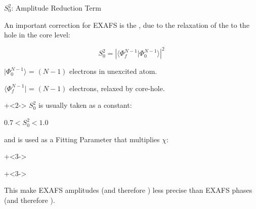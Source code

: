 \begin{slide}{$S_0^2$:  Amplitude Reduction Term}

  An important correction for EXAFS is the {}, due to the relaxation of the {} to the hole in the core level:

   \vmm
   \[
   S_0^2 =  {  |{\langle \Phi^{N-1}_f |\Phi^{N-1}_0 \rangle}|^2}
   \]

   \vmm

   ${| \Phi^{N-1}_0 \rangle }$ = $(N-1)$ electrons in unexcited atom.

   ${\langle \Phi^{N-1}_f|}$   = $(N-1)$ electrons, relaxed by core-hole.

   \vmm

   \onslide+<2->
   ${S_0^2}$ is usually taken as a constant:

   \begin{postitbox}{25mm}
     $ 0.7 < S_0^2 < 1.0 $
   \end{postitbox}

  and is used as a Fitting Parameter that multiplies {$\chi$}:

  \vmm  \onslide+<3->

  \begin{center}
    {}
  \end{center}

  \vmm \onslide+<3->

   \begin{postitbox}{75mm}
     This make EXAFS amplitudes (and therefore {}) less precise
     than EXAFS phases (and therefore {}).
  \end{postitbox}


\vfill
\end{slide}


